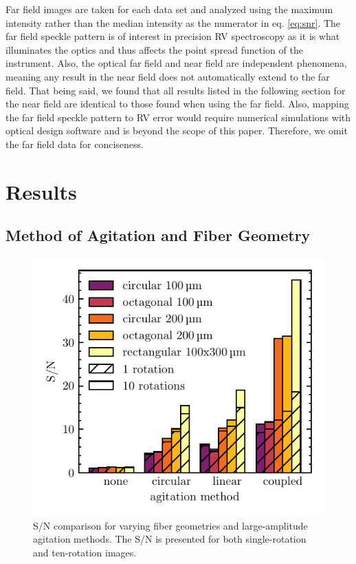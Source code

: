 \documentclass[twocolumn]{emulateapj}
\begin{document}
Far field images are taken for each data set and analyzed using the maximum intensity rather than the median intensity as the numerator in eq. \ref{eq:snr}. The far field speckle pattern is of interest in precision RV spectroscopy as it is what illuminates the optics and thus affects the point spread function of the instrument. Also, the optical far field and near field are independent phenomena, meaning any result in the near field does not automatically extend to the far field. That being said, we found that all results listed in the following section for the near field are identical to those found when using the far field. Also, mapping the far field speckle pattern to RV error would require numerical simulations with optical design software and is beyond the scope of this paper. Therefore, we omit the far field data for conciseness.

\section{Results}
\label{sec:results}

\subsection{Method of Agitation and Fiber Geometry}
\label{subsec:ag_snr}

\begin{figure}
\centering
	\includegraphics[width=\columnwidth]{images/ag_snr.pdf}
	\caption{S/N comparison for varying fiber geometries and large-amplitude agitation methods. The S/N is presented for both single-rotation and ten-rotation images.}
\label{fig:ag_snr}
\end{figure}
\end{document}

